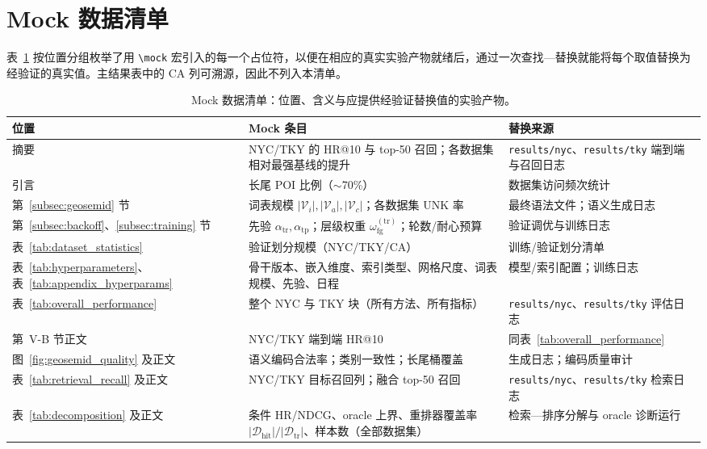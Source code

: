 \documentclass[10pt,fontset=none,twocolumn]{ctexart}
\newcommand{\Train}{\mathcal{D}_{\mathrm{tr}}}
\newcommand{\HitTrain}{\mathcal{D}_{\mathrm{hit}}}
\begin{document}
\section{Mock 数据清单}
\label{app:mock_inventory}

表~\ref{tab:mock_inventory} 按位置分组枚举了用 \texttt{\textbackslash mock} 宏引入的每一个占位符，以便在相应的真实实验产物就绪后，通过一次查找—替换就能将每个取值替换为经验证的真实值。主结果表中的 CA 列可溯源，因此不列入本清单。

\begin{table}[!t]
\centering
\footnotesize
\caption{Mock 数据清单：位置、含义与应提供经验证替换值的实验产物。}
\label{tab:mock_inventory}
\begin{tabular}{p{}p{}p{}}\toprule
位置 & Mock 条目 & 替换来源 \\ \midrule
摘要 & NYC/TKY 的 HR@10 与 top-50 召回；各数据集相对最强基线的提升 & \texttt{results/nyc}、\texttt{results/tky} 端到端与召回日志 \\
引言 & 长尾 POI 比例（$\sim$70\%） & 数据集访问频次统计 \\
第~\ref{subsec:geosemid} 节 & 词表规模 $|\mathcal V_i|,|\mathcal V_a|,|\mathcal V_c|$；各数据集 UNK 率 & 最终语法文件；语义生成日志 \\
第~\ref{subsec:backoff}、\ref{subsec:training} 节 & 先验 $\alpha_{\mathrm{tr}},\alpha_{\mathrm{tp}}$；层级权重 $\omega_{\mathrm{fg}}^{(\mathrm{tr})}$；轮数/耐心预算 & 验证调优与训练日志 \\
表~\ref{tab:dataset_statistics} & 验证划分规模（NYC/TKY/CA） & 训练/验证划分清单 \\
表~\ref{tab:hyperparameters}、表~\ref{tab:appendix_hyperparams} & 骨干版本、嵌入维度、索引类型、网格尺度、词表规模、先验、日程 & 模型/索引配置；训练日志 \\
表~\ref{tab:overall_performance} & 整个 NYC 与 TKY 块（所有方法、所有指标） & \texttt{results/nyc}、\texttt{results/tky} 评估日志 \\
第~V-B 节正文 & NYC/TKY 端到端 HR@10 & 同表~\ref{tab:overall_performance} \\
图~\ref{fig:geosemid_quality} 及正文 & 语义编码合法率；类别一致性；长尾桶覆盖 & 生成日志；编码质量审计 \\
表~\ref{tab:retrieval_recall} 及正文 & NYC/TKY 目标召回列；融合 top-50 召回 & \texttt{results/nyc}、\texttt{results/tky} 检索日志 \\
表~\ref{tab:decomposition} 及正文 & 条件 HR/NDCG、oracle 上界、重排器覆盖率 $|\HitTrain|/|\Train|$、样本数（全部数据集） & 检索—排序分解与 oracle 诊断运行 \\

\end{tabular}
\end{table}
\end{document}
